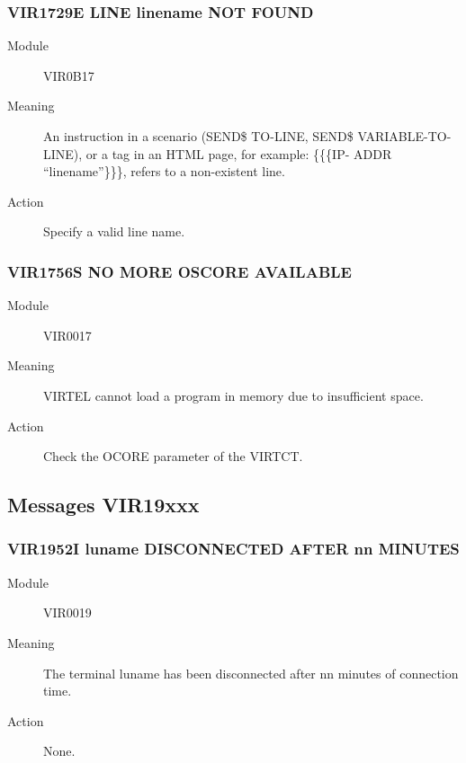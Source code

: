 \documentclass[letterpaper,10pt,english]{sphinxmanual}
\begin{document}
\subsubsection{VIR1729E LINE linename NOT FOUND}
\label{\detokenize{messages:vir1729e-line-linename-not-found}}\begin{description}
\item[{Module}] \leavevmode
VIR0B17

\item[{Meaning}] \leavevmode
An instruction in a scenario (SEND\$ TO-LINE, SEND\$ VARIABLE-TO-LINE), or a tag in an HTML page, for example: \{\{\{IP- ADDR “linename”\}\}\}, refers to a non-existent line.

\item[{Action}] \leavevmode
Specify a valid line name.

\end{description}


\subsubsection{VIR1756S NO MORE OSCORE AVAILABLE}
\label{\detokenize{messages:vir1756s-no-more-oscore-available}}\begin{description}
\item[{Module}] \leavevmode
VIR0017

\item[{Meaning}] \leavevmode
VIRTEL cannot load a program in memory due to insufficient space.

\item[{Action}] \leavevmode
Check the OCORE parameter of the VIRTCT.

\end{description}


\subsection{Messages VIR19xxx}
\label{\detokenize{messages:messages-vir19xxx}}

\subsubsection{VIR1952I luname DISCONNECTED AFTER nn MINUTES}
\label{\detokenize{messages:vir1952i-luname-disconnected-after-nn-minutes}}\begin{description}
\item[{Module}] \leavevmode
VIR0019

\item[{Meaning}] \leavevmode
The terminal luname has been disconnected after nn minutes of connection time.

\item[{Action}] \leavevmode
None.

\end{description}
\end{document}
